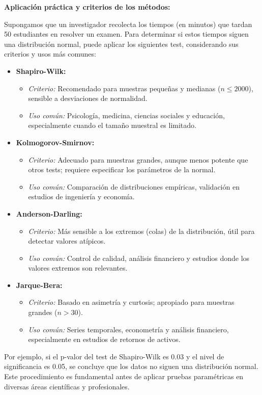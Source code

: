 \begin{remark}
\textbf{Aplicación práctica y criterios de los métodos:}

Supongamos que un investigador recolecta los tiempos (en minutos) que tardan 50 estudiantes en resolver un examen. Para determinar si estos tiempos siguen una distribución normal, puede aplicar los siguientes test, considerando sus criterios y usos más comunes:

\begin{itemize}
    \item \textbf{Shapiro-Wilk:}
    \begin{itemize}
        \item \textit{Criterio:} Recomendado para muestras pequeñas y medianas (\( n \leq 2000 \)), sensible a desviaciones de normalidad.
        \item \textit{Uso común:} Psicología, medicina, ciencias sociales y educación, especialmente cuando el tamaño muestral es limitado.
    \end{itemize}
    \item \textbf{Kolmogorov-Smirnov:}
    \begin{itemize}
        \item \textit{Criterio:} Adecuado para muestras grandes, aunque menos potente que otros tests; requiere especificar los parámetros de la normal.
        \item \textit{Uso común:} Comparación de distribuciones empíricas, validación en estudios de ingeniería y economía.
    \end{itemize}
    \item \textbf{Anderson-Darling:}
    \begin{itemize}
        \item \textit{Criterio:} Más sensible a los extremos (colas) de la distribución, útil para detectar valores atípicos.
        \item \textit{Uso común:} Control de calidad, análisis financiero y estudios donde los valores extremos son relevantes.
    \end{itemize}
    \item \textbf{Jarque-Bera:}
    \begin{itemize}
        \item \textit{Criterio:} Basado en asimetría y curtosis; apropiado para muestras grandes (\( n > 30 \)).
        \item \textit{Uso común:} Series temporales, econometría y análisis financiero, especialmente en estudios de retornos de activos.
    \end{itemize}
\end{itemize}

Por ejemplo, si el p-valor del test de Shapiro-Wilk es 0.03 y el nivel de significancia es 0.05, se concluye que los datos no siguen una distribución normal. Este procedimiento es fundamental antes de aplicar pruebas paramétricas en diversas áreas científicas y profesionales.
\end{remark}


